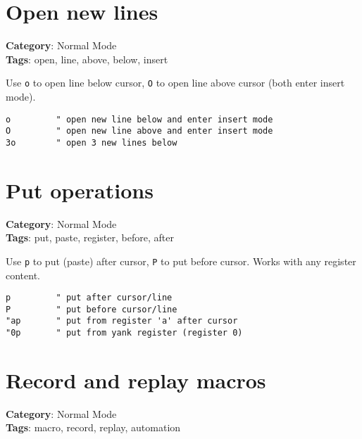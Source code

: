 {{{{{{{{{{\section{Open new lines}

\textbf{Category}: Normal Mode\\ \textbf{Tags}: open, line, above, below, insert
\vspace{0.5cm}

Use {\footnotesize \Verb§o§} to open line below cursor, {\footnotesize \Verb§O§} to open line above cursor (both enter insert mode).

\begin{Exa*}{}
\begin{Verbatim}[fontsize=\footnotesize, breaklines, breakanywhere]
o         " open new line below and enter insert mode
O         " open new line above and enter insert mode
3o        " open 3 new lines below
\end{Verbatim}
\end{Exa*}

\section{Put operations}

\textbf{Category}: Normal Mode\\ \textbf{Tags}: put, paste, register, before, after
\vspace{0.5cm}

Use {\footnotesize \Verb§p§} to put (paste) after cursor, {\footnotesize \Verb§P§} to put before cursor. Works with any register content.

\begin{Exa*}{}
\begin{Verbatim}[fontsize=\footnotesize, breaklines, breakanywhere]
p         " put after cursor/line
P         " put before cursor/line
"ap       " put from register 'a' after cursor
"0p       " put from yank register (register 0)
\end{Verbatim}
\end{Exa*}

\section{Record and replay macros}

\textbf{Category}: Normal Mode\\ \textbf{Tags}: macro, record, replay, automation
\vspace{0.5cm}

}}}}}}}}}}
